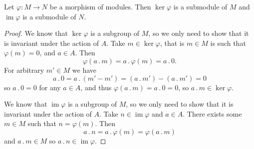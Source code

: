 \documentclass[fleqn]{NotesClass}
\newcommand{\action}{\mathbin{.}}
\DeclareMathOperator{\im}{im}
\begin{document}
    \begin{lma}{}{}
        Let \(\varphi \colon M \to N\) be a morphism of modules.
        Then \(\ker \varphi\) is a submodule of \(M\) and \(\im \varphi\) is a submodule of \(N\).
        \begin{proof}
            \Step{\(\ker \varphi\)}
            We know that \(\ker \varphi\) is a subgroup of \(M\), so we only need to show that it is invariant under the action of \(A\).
            Take \(m \in \ker \varphi\), that is \(m \in M\) is such that \(\varphi(m) = 0\), and \(a \in A\).
            Then
            \begin{equation}
                \varphi(a \action m) = a \action \varphi(m) = a \action 0.
            \end{equation}
            For arbitrary \(m' \in M\) we have
            \begin{equation}
                a \action 0 = a \action (m' - m') = (a \action m') - (a \action m') = 0
            \end{equation}
            so \(a \action 0 = 0\) for any \(a \in A\), and thus \(\varphi(a \action m) = a \action 0 = 0\), so \(a \action m \in \ker \varphi\).
            
            \Step{\(\im \varphi\)}
            We know that \(\im \varphi\) is a subgroup of \(M\), so we only need to show that it is invariant under the action of \(A\).
            Take \(n \in \im \varphi\) and \(a \in A\).
            There exists some \(m \in M\) such that \(n = \varphi(m)\).
            Then
            \begin{equation}
                a \action n = a \action \varphi(m) = \varphi(a \action m)
            \end{equation}
            and \(a \action m \in M\) so \(a \action n \in \im \varphi\).
        \end{proof}
    \end{lma}
    
\end{document}
